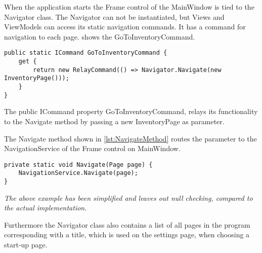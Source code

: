 When the application starts the Frame control of the MainWindow is tied to the Navigator class.
The Navigator can not be instantiated, but Views and ViewModels can access its static navigation commands. It has a command for navigation to each page.  shows the GoToInventoryCommand.

\begin{lstlisting}[caption=GoToInventoryCommand, label={lst:InventoryCommand}, language=CSharp]
public static ICommand GoToInventoryCommand {
	get {
		return new RelayCommand(() => Navigator.Navigate(new InventoryPage()));
	}
}
\end{lstlisting}

The public ICommand property GoToInventoryCommand, relays its functionality to the Navigate method by passing a new InventoryPage as parameter.

The Navigate method shown in \cref{lst:NavigateMethod} routes the parameter to the NavigationService of the Frame control on MainWindow.

\begin{lstlisting}[caption=Navigate method, label={lst:NavigateMethod}, language=CSharp]
private static void Navigate(Page page) {
	NavigationService.Navigate(page);
}
\end{lstlisting}

\textit{The above example has been simplified and leaves out null checking, compared to the actual implementation.}

Furthermore the Navigator class also contains a list of all pages in the program corresponding with a title, which is used on the settings page, when choosing a start-up page.

